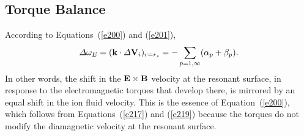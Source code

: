 \documentclass[notitlepage,12pt]{article}
\begin{document}
\subsection{Torque Balance}\label{stb}
According to Equations~(\ref{e200}) and (\ref{e201}),
\begin{equation}\label{e393}
{\mit\Delta}\omega_E = ({\bf k}\cdot{\mit\Delta}{\bf V}_i)_{r=r_s} = -\sum_{p=1,\infty}(\alpha_p+ \beta_p).
\end{equation}
In other words, the shift in the ${\bf E}\times {\bf B}$ velocity at the resonant surface, in response to the electromagnetic
torques that develop there, is mirrored by an equal  shift in the ion fluid velocity. This is the
essence of  Equation~(\ref{e200}), which follows from Equations~(\ref{e217}) and (\ref{e219})
because the torques do not modify the diamagnetic velocity at the resonant surface. 
\end{document}
